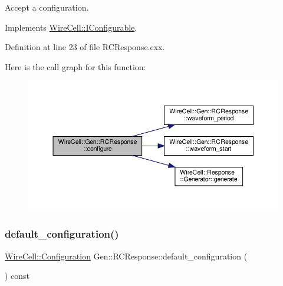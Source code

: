 Accept a configuration. 



Implements \hyperlink{class_wire_cell_1_1_i_configurable_a57ff687923a724093df3de59c6ff237d}{Wire\+Cell\+::\+I\+Configurable}.



Definition at line 23 of file R\+C\+Response.\+cxx.

Here is the call graph for this function\+:
\nopagebreak
\begin{figure}[H]
\begin{center}
\leavevmode
\includegraphics[width=350pt]{class_wire_cell_1_1_gen_1_1_r_c_response_a64fa5b6fb48fce6482836c4489bac542_cgraph}
\end{center}
\end{figure}
\mbox{\label{class_wire_cell_1_1_gen_1_1_r_c_response_ae3835dd640070f3b322b546ef5c3d931}} 
\subsubsection{\texorpdfstring{default\+\_\+configuration()}{default\_configuration()}}
{\footnotesize\ttfamily \hyperlink{namespace_wire_cell_a9f705541fc1d46c608b3d32c182333ee}{Wire\+Cell\+::\+Configuration} Gen\+::\+R\+C\+Response\+::default\+\_\+configuration (\begin{DoxyParamCaption}{ }\end{DoxyParamCaption}) const\hspace{0.3cm}{\ttfamily [virtual]}}



